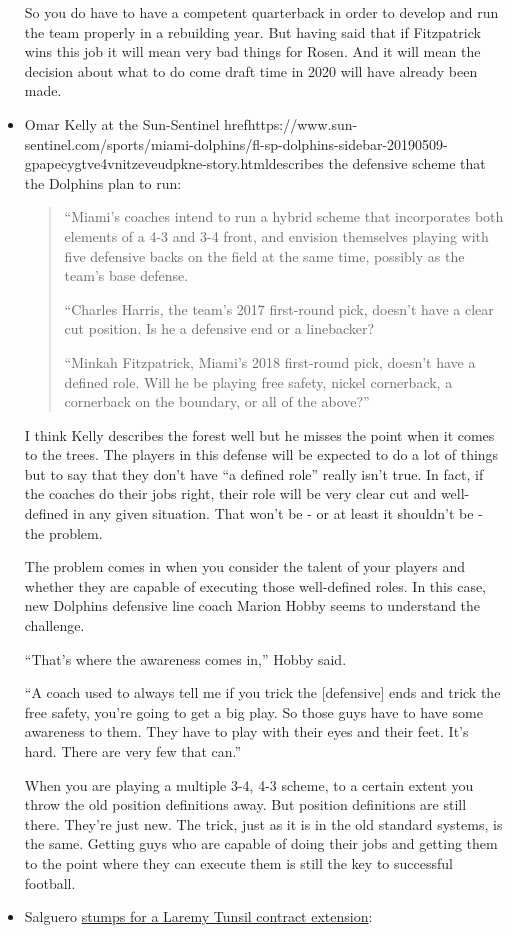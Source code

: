 \documentclass[11pt]{article}
\begin{document}
\begin{itemize}
So you do have to have a competent quarterback in order to develop and run the team properly in a rebuilding year.  But having said that if Fitzpatrick wins this job it will mean very bad things for Rosen.  And it will mean the decision about what to do come draft time in 2020 will have already been made.


\item Omar Kelly at the Sun-Sentinel href{https://www.sun-sentinel.com/sports/miami-dolphins/fl-sp-dolphins-sidebar-20190509-gpapecygtve4vnitzeveudpkne-story.html}{describes the defensive scheme} that the Dolphins plan to run:

\begin{quote}
``Miami’s coaches intend to run a hybrid scheme that incorporates both elements of a 4-3 and 3-4 front, and envision themselves playing with five defensive backs on the field at the same time, possibly as the team’s base defense.

``Charles Harris, the team’s 2017 first-round pick, doesn’t have a clear cut position. Is he a defensive end or a linebacker?

``Minkah Fitzpatrick, Miami’s 2018 first-round pick, doesn’t have a defined role. Will he be playing free safety, nickel cornerback, a cornerback on the boundary, or all of the above?''
\end{quote}

I think Kelly describes the forest well but he misses the point when it comes to the trees.  The players in this defense will be expected to do a lot of things but to say that they don't have ``a defined role'' really isn't true.  In fact, if the coaches do their jobs right, their role will be very clear cut and well-defined in any given situation.  That won't be - or at least it shouldn't be - the problem.

The problem comes in when you consider the talent of your players and whether they are capable of executing those well-defined roles.  In this case, new Dolphins defensive line coach Marion Hobby seems to understand the challenge.

  ``That’s where the awareness comes in,'' Hobby said.

  ``A coach used to always tell me if you trick the [defensive] ends and trick the free safety, you’re going to get a big play.  So those guys have to have some awareness to them. They have to play with their eyes and their feet. It’s hard. There are very few that can.''

  When you are playing a multiple 3-4, 4-3 scheme, to a certain extent you throw the old position definitions away.  But position definitions are still there.  They're just new.  The trick, just as it is in the old standard systems, is the same.  Getting guys who are capable of doing their jobs and getting them to the point where they can execute them is still the key to successful football.
\item Salguero \href{https://www.miamiherald.com/sports/spt-columns-blogs/armando-salguero/article230246299.html}{stumps for a Laremy Tunsil contract extension}:


\end{itemize}
\end{document}
